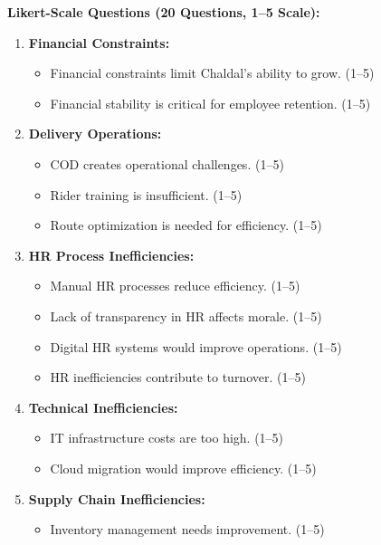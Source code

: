\documentclass[12pt,a4paper]{article}
\begin{document}
\textbf{Likert-Scale Questions (20 Questions, 1–5 Scale):}

\begin{enumerate}
    \item \textbf{Financial Constraints:}
    \begin{itemize}
        \item Financial constraints limit Chaldal’s ability to grow. (1–5)
        \item Financial stability is critical for employee retention. (1–5)
    \end{itemize}
    \item \textbf{Delivery Operations:}
    \begin{itemize}
        \item COD creates operational challenges. (1–5)
        \item Rider training is insufficient. (1–5)
        \item Route optimization is needed for efficiency. (1–5)
    \end{itemize}
    \item \textbf{HR Process Inefficiencies:}
    \begin{itemize}
        \item Manual HR processes reduce efficiency. (1–5)
        \item Lack of transparency in HR affects morale. (1–5)
        \item Digital HR systems would improve operations. (1–5)
        \item HR inefficiencies contribute to turnover. (1–5)
    \end{itemize}
    \item \textbf{Technical Inefficiencies:}
    \begin{itemize}
        \item IT infrastructure costs are too high. (1–5)
        \item Cloud migration would improve efficiency. (1–5)
    \end{itemize}
    \item \textbf{Supply Chain Inefficiencies:}
    \begin{itemize}
        \item Inventory management needs improvement. (1–5)
    \end{itemize}
\end{enumerate}
\end{document}
